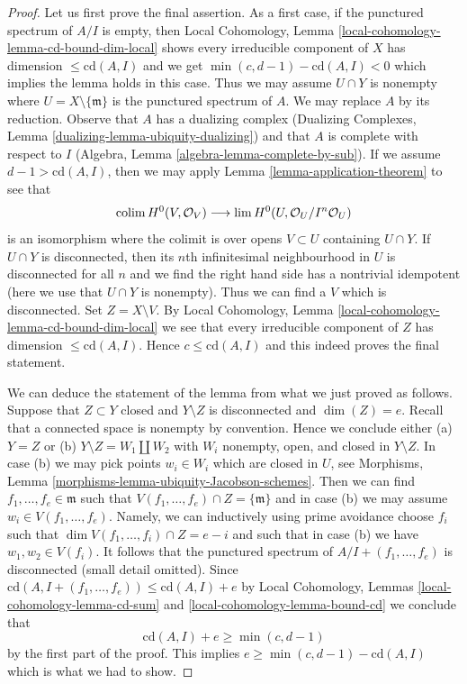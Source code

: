 \begin{proof}
Let us first prove the final assertion. As a first case, if the punctured
spectrum of $A/I$ is empty, then
Local Cohomology, Lemma \ref{local-cohomology-lemma-cd-bound-dim-local}
shows every irreducible component of $X$ has dimension
$\leq \text{cd}(A, I)$ and we get $\min(c, d - 1) - \text{cd}(A, I) < 0$
which implies the lemma holds in this case. Thus we may assume
$U \cap Y$ is nonempty where $U = X \setminus \{\mathfrak m\}$
is the punctured spectrum of $A$. We may replace $A$ by its reduction.
Observe that $A$ has a dualizing complex
(Dualizing Complexes, Lemma \ref{dualizing-lemma-ubiquity-dualizing})
and that $A$ is complete with respect to $I$
(Algebra, Lemma \ref{algebra-lemma-complete-by-sub}).
If we assume $d - 1 > \text{cd}(A, I)$, then we may apply
Lemma \ref{lemma-application-theorem} to see that
$$
\mathop{\mathrm{colim}}\nolimits H^0(V, \mathcal{O}_V)
\longrightarrow
\mathop{\mathrm{lim}}\nolimits H^0(U, \mathcal{O}_U/I^n\mathcal{O}_U)
$$
is an isomorphism where the colimit is over opens $V \subset U$
containing $U \cap Y$. If $U \cap Y$ is disconnected, then
its $n$th infinitesimal neighbourhood in $U$ is disconnected
for all $n$ and we find the
right hand side has a nontrivial idempotent (here we use
that $U \cap Y$ is nonempty).
Thus we can find a $V$ which is disconnected.
Set $Z = X \setminus V$. By
Local Cohomology, Lemma \ref{local-cohomology-lemma-cd-bound-dim-local}
we see that every irreducible component of $Z$ has dimension
$\leq \text{cd}(A, I)$. Hence $c \leq \text{cd}(A, I)$ and this
indeed proves the final statement.

\medskip\noindent
We can deduce the statement of the lemma from what we just proved
as follows. Suppose that $Z \subset Y$ closed and $Y \setminus Z$ is
disconnected and $\dim(Z) = e$. Recall that a connected space is nonempty
by convention. Hence we conclude either (a) $Y = Z$ or (b)
$Y \setminus Z = W_1 \amalg W_2$ with $W_i$ nonempty, open, and closed
in $Y \setminus Z$. In case (b) we may pick points $w_i \in W_i$
which are closed in $U$, see
Morphisms, Lemma \ref{morphisms-lemma-ubiquity-Jacobson-schemes}.
Then we can find $f_1, \ldots, f_e \in \mathfrak m$
such that $V(f_1, \ldots, f_e) \cap Z = \{\mathfrak m\}$
and in case (b) we may assume $w_i \in V(f_1, \ldots, f_e)$.
Namely, we can inductively using prime avoidance
choose $f_i$ such that $\dim V(f_1, \ldots, f_i) \cap Z = e - i$
and such that in case (b) we have $w_1, w_2 \in V(f_i)$.
It follows that the punctured spectrum of $A/I + (f_1, \ldots, f_e)$
is disconnected (small detail omitted). Since
$\text{cd}(A, I + (f_1, \ldots, f_e)) \leq \text{cd}(A, I) + e$ by
Local Cohomology, Lemmas \ref{local-cohomology-lemma-cd-sum} and
\ref{local-cohomology-lemma-bound-cd} we conclude that
$$
\text{cd}(A, I) + e \geq \min(c, d - 1)
$$
by the first part of the proof. This implies
$e \geq \min(c, d - 1) - \text{cd}(A, I)$ which is what we had to show.
\end{proof}

